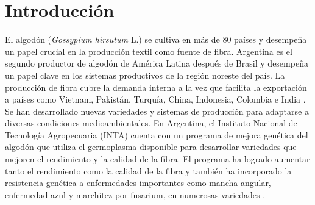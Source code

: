 \documentclass[12pt,oneside]{reedthesis}
\renewcommand{\headrulewidth}{0pt} %
\begin{document}
\mainmatter %
\pagestyle{fancyplain} %
\renewcommand{\headrulewidth}{0.4pt} %


\chapter*{Introducción}\label{introducciuxf3n}

El algodón (\emph{Gossypium hirsutum} L.) se cultiva en más de 80 países y desempeña un papel crucial en la producción textil como fuente de fibra. Argentina es el segundo productor de algodón de América Latina después de Brasil y desempeña un papel clave en los sistemas productivos de la región noreste del país. La producción de fibra cubre la demanda interna a la vez que facilita la exportación a países como Vietnam, Pakistán, Turquía, China, Indonesia, Colombia e India \autocite{icac2023,paytas2013}. Se han desarrollado nuevas variedades y sistemas de producción para adaptarse a diversas condiciones medioambientales. En Argentina, el Instituto Nacional de Tecnología Agropecuaria (INTA) cuenta con un programa de mejora genética del algodón que utiliza el germoplasma disponible para desarrollar variedades que mejoren el rendimiento y la calidad de la fibra. El programa ha logrado aumentar tanto el rendimiento como la calidad de la fibra y también ha incorporado la resistencia genética a enfermedades importantes como mancha angular, enfermedad azul y marchitez por fusarium, en numerosas variedades \autocite{royo2007,scarpin2022,scarpin2023}.
\end{document}
